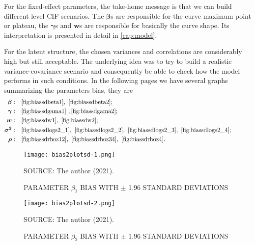 For the fixed-effect parameters, the take-home message is that we can
build different level CIF scenarios. The \(\bm{\beta}\)s are responsible
for the curve maximum point or plateau, the \(\bm{\gamma}\)s and
\(\bm{w}\)s are responsible for basically the curve shape. Its
interpretation is presented in detail in \autoref{cap:model}.

For the latent structure, the chosen variances and correlations are
considerably high but still acceptable. The underlying idea was to try
to build a realistic variance-covariance scenario and consequently be
able to check how the model performs in such conditions. In the
following pages we have several graphs summarizing the parameters bias,
they are
\begin{align*}
 \bm{\beta}:&\quad\text{\autoref{fig:biassdbeta1}},~
                  \text{\autoref{fig:biassdbeta2}};\hspace{8cm}\\
 \bm{\gamma}:&\quad\text{\autoref{fig:biassdgama1}}~,
                   \text{\autoref{fig:biassdgama2}};\\
 \bm{w}:&\quad\text{\autoref{fig:biassdw1}},~
              \text{\autoref{fig:biassdw2}};\\
 \bm{\sigma^{2}}:&\quad\text{\autoref{fig:biassdlogs2_1}},~
                      \text{\autoref{fig:biassdlogs2_2}},~
                      \text{\autoref{fig:biassdlogs2_3}},~
                      \text{\autoref{fig:biassdlogs2_4}};\\
 \bm{\rho}:&\quad\text{\autoref{fig:biassdrhoz12}},~
                 \text{\autoref{fig:biassdrhoz34}},~
                 \text{\autoref{fig:biassdrhoz4}}.
\end{align*}

\begin{figure}[H]
 \setlength{\abovecaptionskip}{.0001pt}
 \caption{PARAMETER \(\beta_{1}\) BIAS WITH \(\pm\) 1.96 STANDARD
          DEVIATIONS}
 \vspace{0.2cm}\centering
 \texttt{[image: bias2plotsd-1.png]}\\
 \begin{footnotesize}
  SOURCE: The author (2021).
 \end{footnotesize}
 \label{fig:biassdbeta1}
\end{figure}

\begin{figure}[H]
 \setlength{\abovecaptionskip}{.0001pt}
 \caption{PARAMETER \(\beta_{2}\) BIAS WITH \(\pm\) 1.96 STANDARD
         DEVIATIONS}
 \vspace{0.2cm}\centering
 \texttt{[image: bias2plotsd-2.png]}\\
 \begin{footnotesize}
  SOURCE: The author (2021).
 \end{footnotesize}
 \label{fig:biassdbeta2}
\end{figure}

